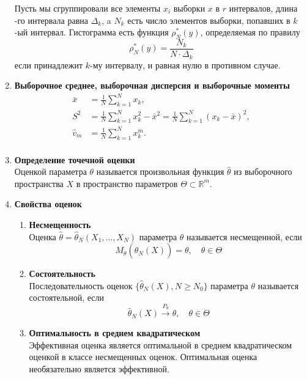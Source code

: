 \documentclass[A4]{article}
\begin{document}
\begin{enumerate}
	Пусть мы сгруппировали все элементы $x_i$ выборки $x$ в $r$ интервалов, длина -го интервала равна $\Delta_k$, a $N_k$ есть число элементов выборки, попавших в $k$-ый интервал. Гистограмма есть функция $\rho_N^*(y)$, определяемая по правилу
	\begin{equation}
	\rho_N^*(y)=\frac{N_k}{N\cdot \Delta_k}
	\end{equation}
	если принадлежит $k$-му интервалу, и равная нулю в противном случае.
	\item \textbf{Выборочное среднее, выборочная дисперсия и выборочные моменты}\\
	\begin{equation}
	\begin{aligned}
	\bar{x}&=\frac{1}{N}\sum_{k=1}^{N} x_k,\\
	S^2&=\frac{1}{N}\sum_{k=1}^{N} x_k^2-\bar{x}^2=\frac{1}{N}\sum_{k=1}^{N} (x_k-\bar{x})^2,\\
	\hat{v}_m&=\frac{1}{N}\sum_{k=1}^{N} x_k^m.\\
	\end{aligned}
	\end{equation}
	\item \textbf{Определение точечной оценки}\\
	Оценкой параметра $\theta$ называется произвольная функция $\hat{\theta}$ из выборочного пространства $X$ в пространство параметров $\Theta\subset \mathbb{R}^m$.
	\item \textbf{Свойства оценок}
	\begin{enumerate}
		\item \textbf{Несмещенность}\\
		Оценка $\hat{\theta} = \hat{\theta}_N(X_1,\ldots,X_N)$ параметра $\theta$ называется несмещенной, если 
		\begin{equation}
		M_{\theta}( \hat{\theta}_N(X))=\theta,\quad \theta\in\Theta
		\end{equation}
		\item \textbf{Состоятельность}\\
		Последовательность оценок $\{\hat{\theta}_N(X),N\ge N_0\}$ параметра $\theta$ называется состоятельной, если 
		\begin{equation}
		\hat{\theta}_N(X)\stackrel{P_{\theta}}{\rightarrow}\theta,\quad \theta\in\Theta
		\end{equation}
		\item \textbf{Оптимальность в среднем квадратическом}\\
		Эффективная оценка является оптимальной в среднем квадратическом оценкой в классе несмещенных оценок. Оптимальная оценка необязательно является эффективной. 

\end{enumerate}
\end{enumerate}
\end{document}
